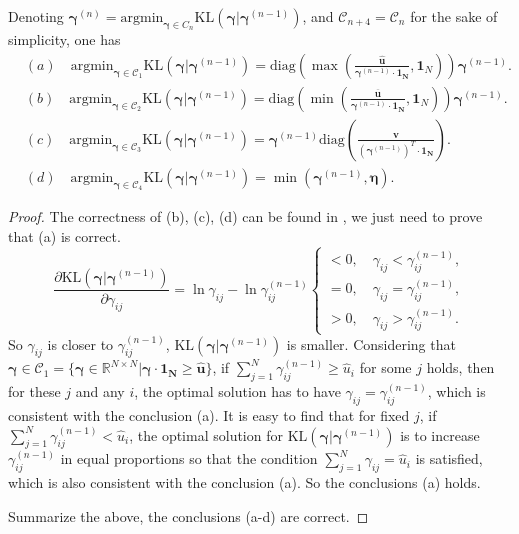 \documentclass[review,hidelinks,onefignum,onetabnum]{siamart220329}
\begin{document}
\begin{proposition}
Denoting $	\bm{\gamma}^{(n)}=\mathrm{argmin}_{\bm{\gamma}\in C_n} \mathrm{KL}(\bm{\gamma}|\bm{\gamma}^{(n-1)})$, and $\mathcal{C}_{n+4} = \mathcal{C}_{n}$ for the sake of simplicity, one has
\begin{equation*}
    \begin{aligned}
    	& (a) \quad \mathrm{argmin}_{\bm{\gamma}\in \mathcal{C}_1} \mathrm{KL}(\bm{\gamma}|\bm{\gamma}^{(n-1)})=\mathrm{diag} \left(\max \left(\frac{\bm{\hat{u}}}{\bm{\gamma}^{(n-1)}\cdot \bm{1_{N}}},\bm{1}_N\right)\right) \bm{\gamma}^{(n-1)}.\\
     	& (b) \quad  \mathrm{argmin}_{\bm{\gamma}\in \mathcal{C}_2} \mathrm{KL}(\bm{\gamma}|\bm{\gamma}^{(n-1)})=\mathrm{diag} \left(\min \left(\frac{\bm{\overline{u}}}{\bm{\gamma}^{(n-1)}\cdot \bm{1_{N}}},\bm{1}_N\right)\right) \bm{\gamma}^{(n-1)}.\\
      	& (c) \quad  \mathrm{argmin}_{\bm{\gamma}\in \mathcal{C}_3} \mathrm{KL}(\bm{\gamma}|\bm{\gamma}^{(n-1)})=\bm{\gamma}^{(n-1)} \mathrm{diag} \left(\frac{\bm{v}}{(\bm{\gamma}^{(n-1)})^T \cdot \bm{1_{N}}}\right).\\
      	& (d) \quad  \mathrm{argmin}_{\bm{\gamma}\in \mathcal{C}_4} \mathrm{KL}(\bm{\gamma}|\bm{\gamma}^{(n-1)})=\min(\bm{\gamma}^{(n-1)},\bm{\eta}).
\end{aligned}
\end{equation*}

\end{proposition}
\begin{proof}
    The correctness of (b), (c), (d) can be found in \cite{IBP}, we just need to prove that (a) is correct.
\begin{equation}
        \frac{\partial \mathrm{KL}(\bm{\gamma}|\bm{\gamma}^{(n-1)})}{\partial \gamma_{ij}}=\ln \gamma_{ij}-\ln \gamma^{(n-1)}_{ij}\left\{
    \begin{aligned}
        <0,\quad \gamma_{ij}<\gamma^{(n-1)}_{ij},\\
        =0,\quad \gamma_{ij}=\gamma^{(n-1)}_{ij},\\
        >0,\quad \gamma_{ij}>\gamma^{(n-1)}_{ij}.
    \end{aligned}
    \right.
\end{equation}
So $\gamma_{ij}$ is closer to $\gamma^{(n-1)}_{ij}$, $\mathrm{KL}(\bm{\gamma}|\bm{\gamma}^{(n-1)})$ is smaller. 
Considering that $\bm{\gamma}\in \mathcal{C}_1= \{\bm{\gamma}\in \mathbb{R}^{N\times N}|\bm{\gamma}\cdot \bm{1_{N}}\geq \bm{\hat{u}}\}$, if $\sum_{j=1}^{N} \gamma^{(n-1)}_{ij}\geq \hat{u}_i$ for some $j$ holds, then for these $j$ and any $i$, the optimal solution has to have $\gamma_{ij}=\gamma^{(n-1)}_{ij}$, which is consistent with the conclusion (a). 
It is easy to find that for fixed $j$, if $\sum_{j=1}^{N} \gamma^{(n-1)}_{ij}< \hat{u}_i$, the optimal solution for $ \mathrm{KL}(\bm{\gamma}|\bm{\gamma}^{(n-1)})$ is to increase $\gamma^{(n-1)}_{ij}$ in equal proportions so that the condition $\sum_{j=1}^{N} \gamma_{ij}= \hat{u}_i$ is satisfied, which is also consistent with the conclusion (a). So the conclusions (a) holds.

Summarize the above, the conclusions (a-d) are correct.
\end{proof}
\end{document}
